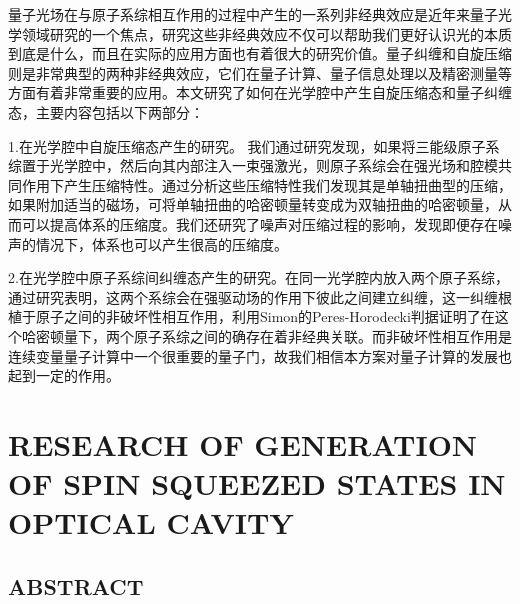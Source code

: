 {
	\par
	\linespread{1.5}\selectfont
	
	
	量子光场在与原子系综相互作用的过程中产生的一系列非经典效应是近年来量子光学领域研究的一个焦点，研究这些非经典效应不仅可以帮助我们更好认识光的本质到底是什么，而且在实际的应用方面也有着很大的研究价值。量子纠缠和自旋压缩则是非常典型的两种非经典效应，它们在量子计算、量子信息处理以及精密测量等方面有着非常重要的应用。本文研究了如何在光学腔中产生自旋压缩态和量子纠缠态，主要内容包括以下两部分：
	
	1.在光学腔中自旋压缩态产生的研究。%
	我们通过研究发现，如果将三能级原子系综置于光学腔中，然后向其内部注入一束强激光，则原子系综会在强光场和腔模共同作用下产生压缩特性。通过分析这些压缩特性我们发现其是单轴扭曲型的压缩，如果附加适当的磁场，可将单轴扭曲的哈密顿量转变成为双轴扭曲的哈密顿量，从而可以提高体系的压缩度。我们还研究了噪声对压缩过程的影响，发现即便存在噪声的情况下，体系也可以产生很高的压缩度。
	
	2.在光学腔中原子系综间纠缠态产生的研究。在同一光学腔内放入两个原子系综，通过研究表明，这两个系综会在强驱动场的作用下彼此之间建立纠缠，这一纠缠根植于原子之间的非破坏性相互作用，利用Simon的Peres-Horodecki判据证明了在这个哈密顿量下，两个原子系综之间的确存在着非经典关联。而非破坏性相互作用是连续变量量子计算中一个很重要的量子门，故我们相信本方案对量子计算的发展也起到一定的作用。
\par

\vbox{}
}

\chapter[Abstract]{\linespread{1.5}\selectfont RESEARCH OF GENERATION OF SPIN SQUEEZED STATES IN OPTICAL CAVITY}

\vbox{}
\section*{\qquad\qquad\qquad\qquad\qquad\quad\quad ABSTRACT}
\vbox{}


